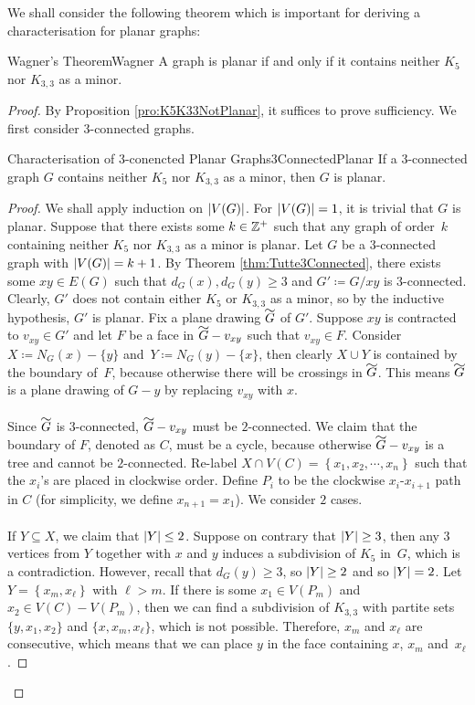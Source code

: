 \documentclass[math]{amznotes}
\renewcommand\widetilde[1]{\ThisStyle{%
  \setbox0=\hbox{$\SavedStyle#1$}%
  \stackengine{1pt-\LMpt}{$\SavedStyle#1$}{%
    \stretchto{\scaleto{\SavedStyle\mkern.2mu\sim}{.5467\wd0}}{.5\ht0}%
  }{O}{c}{F}{T}{S}%
}}
\theoremstyle{remark}
\begin{document}
We shall consider the following theorem which is important for deriving a characterisation for planar graphs:
\begin{thmbox}{Wagner's Theorem}{Wagner}
    A graph is planar if and only if it contains neither $K_5$ nor $K_{3, 3}$ as a minor.
    \tcblower
    \begin{proof}
        By Proposition \ref{pro:K5K33NotPlanar}, it suffices to prove sufficiency. We first consider $3$-connected graphs.
        \begin{lembox}{Characterisation of $3$-conencted Planar Graphs}{3ConnectedPlanar}
            If a $3$-connected graph $G$ contains neither $K_5$ nor $K_{3, 3}$ as a minor, then $G$ is planar.
            \tcblower
            \begin{proof}
                We shall apply induction on ${\left\lvert {V(G)} \right\rvert}$. For ${\left\lvert {V(G)} \right\rvert} = 1$, it is trivial that $G$ is planar. Suppose that there exists some $k \in \mathbb{Z}^+$ such that any graph of order~$k$ containing neither $K_5$ nor $K_{3, 3}$ as a minor is planar. Let $G$ be a $3$-connected graph with ${\left\lvert {V(G)} \right\rvert} = k + 1$. By Theorem \ref{thm:Tutte3Connected}, there exists some $xy \in E(G)$ such that $d_G(x), d_G(y) \geq 3$ and $G' \coloneqq G/xy$ is $3$-connected. Clearly, $G'$ does not contain either $K_5$ or $K_{3, 3}$ as a minor, so by the inductive hypothesis, $G'$ is planar. Fix a plane drawing $\widetilde{G}$ of $G'$. Suppose $xy$ is contracted to $v_{xy} \in G'$ and let $F$ be a face in $\widetilde{G} - v_{xy}$ such that $v_{xy} \in F$. Consider $X \coloneqq N_G(x) - \{y\}$ and~$Y \coloneqq N_G(y) - \{x\}$, then clearly $X \cup Y$ is contained by the boundary of~$F$, because otherwise there will be crossings in $\widetilde{G}$. This means $\widetilde{G}$ is a plane drawing of $G - y$ by replacing $v_{xy}$ with $x$.
                \\\\ 
                Since $\widetilde{G}$ is $3$-connected, $\widetilde{G} - v_{xy}$ must be $2$-connected. We claim that the boundary of $F$, denoted as $C$, must be a cycle, because otherwise $\widetilde{G} - v_{xy}$ is a tree and cannot be $2$-connected. Re-label $X \cap V(C) = \left\{x_1, x_2, \cdots, x_n\right\}$ such that the $x_i$'s are placed in clockwise order. Define $P_i$ to be the clockwise $x_i$-$x_{i + 1}$ path in $C$ (for simplicity, we define $x_{n + 1} = x_1$). We consider $2$ cases.
                \\\\
                If $Y \subseteq X$, we claim that ${\left\lvert {Y} \right\rvert} \leq 2$. Suppose on contrary that ${\left\lvert {Y} \right\rvert} \geq 3$, then any $3$ vertices from $Y$ together with $x$ and $y$ induces a subdivision of $K_5$ in~$G$, which is a contradiction. However, recall that $d_G(y) \geq 3$, so ${\left\lvert {Y} \right\rvert} \geq 2$ and so ${\left\lvert {Y} \right\rvert} = 2$. Let $Y = \left\{x_m, x_{\ell}\right\}$ with $\ell > m$. If there is some $x_1 \in V(P_m)$ and~$x_2 \in V(C) - V(P_m)$, then we can find a subdivision of $K_{3, 3}$ with partite sets $\{y, x_1, x_2\}$ and $\{x, x_m, x_{\ell}\}$, which is not possible. Therefore, $x_m$ and $x_{\ell}$ are consecutive, which means that we can place $y$ in the face containing $x$, $x_m$ and~$x_{\ell}$.

\end{proof}
\end{lembox}
\end{proof}
\end{thmbox}
\end{document}
